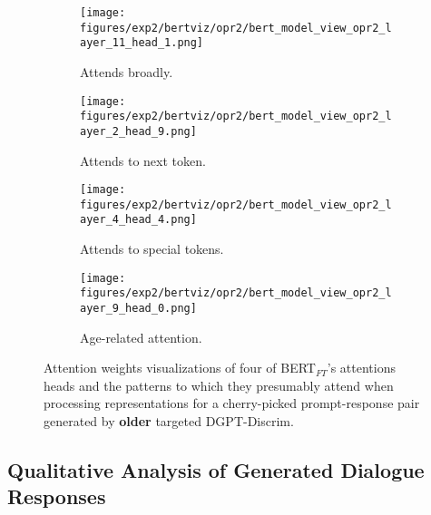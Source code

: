 \begin{figure}[H]
     \centering
     \begin{subfigure}[b]{0.22\textwidth}
        \centering
        \texttt{[image: figures/exp2/bertviz/opr2/bert\_model\_view\_opr2\_layer\_11\_head\_1.png]}
        \captionsetup{font=footnotesize,labelfont=footnotesize}
        \caption{Attends broadly.}
        \label{subfig:bertviz_model_view_opr2_broad}
     \end{subfigure}
     \quad
     \begin{subfigure}[b]{0.22\textwidth}
        \centering
        \texttt{[image: figures/exp2/bertviz/opr2/bert\_model\_view\_opr2\_layer\_2\_head\_9.png]}
        \captionsetup{font=footnotesize,labelfont=footnotesize}
        \caption{Attends to next token.}
        \label{subfig:bertviz_model_view_opr2_next}
     \end{subfigure}
    \quad
    \begin{subfigure}[b]{0.22\textwidth}
        \centering
        \texttt{[image: figures/exp2/bertviz/opr2/bert\_model\_view\_opr2\_layer\_4\_head\_4.png]}
        \captionsetup{font=footnotesize,labelfont=footnotesize}
        \caption{Attends to special tokens.}
        \label{subfig:bertviz_model_view_opr2_special}
     \end{subfigure}
    \quad
     \begin{subfigure}[b]{0.22\textwidth}
        \centering
        \texttt{[image: figures/exp2/bertviz/opr2/bert\_model\_view\_opr2\_layer\_9\_head\_0.png]}
        \captionsetup{font=footnotesize,labelfont=footnotesize}
        \caption{Age-related attention.}
        \label{subfig:bertviz_model_view_opr2_age}
     \end{subfigure}
    \caption{Attention weights visualizations of four of BERT$_{FT}$'s attentions heads and the patterns to which they presumably attend when processing representations for a cherry-picked prompt-response pair generated by \textbf{older} targeted DGPT-Discrim.}
    \label{fig:bertviz_model_view_opr2}
\end{figure}

\subsection{Qualitative Analysis of Generated Dialogue Responses}
\label{subsec:ctg_anal_qualitative}


